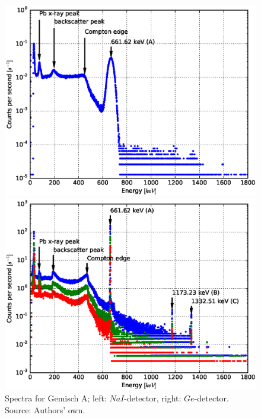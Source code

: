 \documentclass[a4paper]{article}
\begin{document}
\begin{figure}[H]
	\begin{minipage}[t]{0.5\textwidth}
		\begin{center}
		\includegraphics[width=1.0\textwidth]{plots/gemisch_a.eps}
		\end{center}
	\end{minipage}
	\begin{minipage}[t]{0.5\textwidth}
		\begin{center}
		\includegraphics[width=1.0\textwidth]{plots/gemisch_a_ged.eps}
		\end{center}
	\end{minipage}
	\caption{Spectra for Gemisch A; left: $NaI$-detector, right: $Ge$-detector. Source: Authors' own.}
	\label{fig:gemisch_a}
\end{figure}
\end{document}
